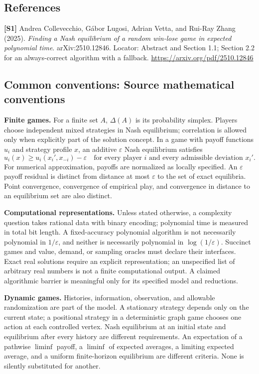 \documentclass[11pt,a4paper]{article}
\begin{document}
\subsection*{References}
\begingroup\footnotesize\raggedright
{\footnotesize\raggedright
\textbf{[S1]} Andrea Collevecchio, G\'abor Lugosi, Adrian Vetta, and Rui-Ray Zhang (2025). \emph{Finding a Nash equilibrium of a random win-lose game in expected polynomial time}. arXiv:2510.12846. Locator: Abstract and Section 1.1; Section 2.2 for an always-correct algorithm with a fallback. \url{https://arxiv.org/pdf/2510.12846}\par}
\par\endgroup

\subsection*{Common conventions: Source mathematical conventions}

\textbf{Finite games.} For a finite set $A$, $\Delta(A)$ is its probability
simplex. Players choose independent mixed strategies in Nash equilibrium;
correlation is allowed only when explicitly part of the solution concept.
In a game with payoff functions $u_i$ and strategy profile $x$, an additive
$\varepsilon$ Nash equilibrium satisfies
\[
 u_i(x)\geq u_i(x_i',x_{-i})-\varepsilon
 \quad\text{for every player $i$ and every admissible deviation $x_i'$}.
\]
For numerical approximation, payoffs are normalized as locally specified.
An $\varepsilon$ payoff residual is distinct from distance at most
$\varepsilon$ to the set of exact equilibria. Point convergence, convergence
of empirical play, and convergence in distance to an equilibrium set are
also distinct.

\textbf{Computational representations.} Unless stated otherwise, a complexity
question takes rational data with binary encoding; polynomial time is measured
in total bit length. A fixed-accuracy polynomial algorithm is not necessarily
polynomial in $1/\varepsilon$, and neither is necessarily polynomial in
$\log(1/\varepsilon)$. Succinct games and value, demand, or sampling oracles
must declare their interfaces. Exact real solutions require an explicit
representation; an unspecified list of arbitrary real numbers is not a
finite computational output. A claimed algorithmic barrier is meaningful
only for its specified model and reductions.

\textbf{Dynamic games.} Histories, information, observation, and allowable
randomization are part of the model. A stationary strategy depends only on
the current state; a positional strategy in a deterministic graph game
chooses one action at each controlled vertex. Nash equilibrium at an initial
state and equilibrium after every history are different requirements.
An expectation of a pathwise $\liminf$ payoff, a $\liminf$ of expected averages,
a limiting expected average, and a uniform finite-horizon equilibrium are
different criteria. None is silently substituted for another.
\end{document}
